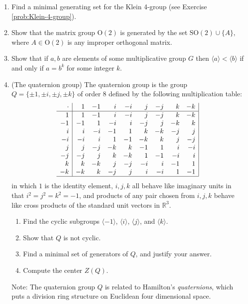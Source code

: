 \documentclass[11pt]{article}
\newenvironment{problems}
{
 \begin{enumerate}[topsep=1pt,itemsep=0pt,parsep=2pt,leftmargin=0.6cm,%
 label={\arabic*.}, ref=\arabic*] \small
}
{
 \end{enumerate}
}
\theoremstyle{definition}
\newcommand{\R}{\mathbb{R}} %
\newcommand{\gen}[1]{\langle #1 \rangle}
\renewcommand{\O}{\mathrm{O}}
\newcommand{\SO}{\mathrm{SO}}
\begin{document}
\begin{problems}
\item Find a minimal generating set for the Klein 4-group (see Exercise
  \ref{prob:Klein-4-group}).

\item Show that the matrix group $\O(2)$ is generated by the set
  $\SO(2) \cup \{A\}$, where $A \in \O(2)$ is any improper orthogonal
  matrix.

\item Show that if $a,b$ are elements of some multiplicative group $G$
  then $\gen{a} < \gen{b}$ if and only if $a = b^k$ for some integer
  $k$.


\item{} (The quaternion group) The quaternion
  group is the group $Q = \{ \pm 1, \pm i, \pm j, \pm k\}$ of order 8
  defined by the following multiplication table:
  \[
  \begin{array}{r|rrrrrrrr|}
  \cdot&1&-1&i&-i&j&-j&k&-k\\ \hline
  1 & 1&-1&i&-i&j&-j&k&-k\\
  -1& -1&1&-i&i&-j&j&-k&k\\
  i & i&-i&-1&1&k&-k&-j&j\\
  -i& -i&i&1&-1&-k&k&j&-j\\
  j & j&-j&-k&k&-1&1&i&-i\\
  -j& -j&j&k&-k&1&-1&-i&i\\
  k & k&-k&j&-j&-i&i&-1&1\\
  -k& -k&k&-j&j&i&-i&1&-1\\ \hline
  \end{array}
  \]
  in which $1$ is the identity element, $i,j,k$ all behave like
  imaginary units in that $i^2 = j^2 = k^2 = -1$, and products of any
  pair chosen from $i,j, k$ behave like cross products of the standard
  unit vectors in $\R^3$.

  \begin{enumerate}
  \item Find the cyclic subgroups $\gen{-1}$, $\gen{i}$, $\gen{j}$,
    and $\gen{k}$.
  \item Show that $Q$ is not cyclic.
  \item Find a minimal set of generators of $Q$, and justify your
    answer.
  \item Compute the center $Z(Q)$.
  \end{enumerate}
  
  Note: The quaternion group $Q$ is related to Hamilton's
  \emph{quaternions}, which puts a division ring structure on
  Euclidean four dimensional space.


\end{problems}
\end{document}
